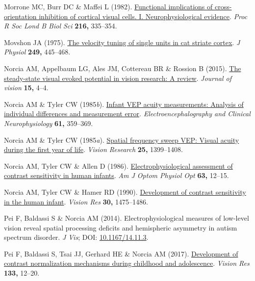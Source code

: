 \documentclass[
  letterpaper,
  DIV=11,
  numbers=noendperiod]{scrartcl}
\newlength{\cslhangindent}
\newenvironment{CSLReferences}[2] %
 {\begin{list}{}{%
  \setlength{\itemindent}{0pt}
  \setlength{\leftmargin}{0pt}
  \setlength{\parsep}{0pt}
  \ifodd #1
   \setlength{\leftmargin}{\cslhangindent}
   \setlength{\itemindent}{-1\cslhangindent}
  \fi
  \setlength{\itemsep}{#2\baselineskip}}}
 {\end{list}}
\begin{document}
\begin{CSLReferences}{1}{1}
Morrone MC, Burr DC \& Maffei L (1982).
\href{https://doi.org/10.1098/rspb.1982.0078}{Functional implications of
cross-orientation inhibition of cortical visual cells. I.
Neurophysiological evidence}. \emph{Proc R Soc Lond B Biol Sci}
\textbf{216,} 335--354.

Movshon JA (1975).
\href{https://doi.org/10.1113/jphysiol.1975.sp011025}{The velocity
tuning of single units in cat striate cortex}. \emph{J Physiol}
\textbf{249,} 445--468.

Norcia AM, Appelbaum LG, Ales JM, Cottereau BR \& Rossion B (2015).
\href{https://doi.org/10.1167/15.6.4}{The steady-state visual evoked
potential in vision research: {A} review}. \emph{Journal of vision}
\textbf{15,} 4--4.

Norcia AM \& Tyler CW (1985\emph{b}).
\href{https://doi.org/10.1016/0013-4694(85)91026-0}{Infant {VEP} acuity
measurements: Analysis of individual differences and measurement error}.
\emph{Electroencephalography and Clinical Neurophysiology} \textbf{61,}
359--369.

Norcia AM \& Tyler CW (1985\emph{a}).
\href{https://doi.org/10.1016/0042-6989(85)90217-2}{Spatial frequency
sweep {VEP}: Visual acuity during the first year of life}. \emph{Vision
Research} \textbf{25,} 1399--1408.

Norcia AM, Tyler CW \& Allen D (1986).
\href{https://doi.org/10.1097/00006324-198601000-00003}{Electrophysiological
assessment of contrast sensitivity in human infants}. \emph{Am J Optom
Physiol Opt} \textbf{63,} 12--15.

Norcia AM, Tyler CW \& Hamer RD (1990).
\href{https://doi.org/10.1016/0042-6989(90)90028-j}{Development of
contrast sensitivity in the human infant}. \emph{Vision Res}
\textbf{30,} 1475--1486.

Pei F, Baldassi S \& Norcia AM (2014). Electrophysiological measures of
low-level vision reveal spatial processing deficits and hemispheric
asymmetry in autism spectrum disorder. \emph{J Vis}; DOI:
\href{https://doi.org/10.1167/14.11.3}{10.1167/14.11.3}.

Pei F, Baldassi S, Tsai JJ, Gerhard HE \& Norcia AM (2017).
\href{https://doi.org/10.1016/j.visres.2016.03.010}{Development of
contrast normalization mechanisms during childhood and adolescence}.
\emph{Vision Res} \textbf{133,} 12--20.


\end{CSLReferences}
\end{document}
